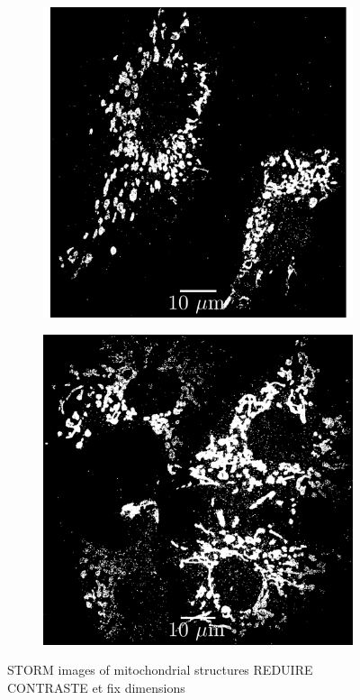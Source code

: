 \begin{figure}
    \begin{subfigure}{0.49\textwidth}
        \includegraphics[width=\textwidth]{figures/mitochondria_image4.png}
        \caption{}
        \label{fig:mitochondria_image4}
    \end{subfigure}
    \begin{subfigure}{0.49\textwidth}
        \includegraphics[width=\textwidth]{figures/mitochondria_image11.png}
        \caption{}
        \label{fig:mitochondria_image11}
    \end{subfigure}
    \caption{STORM images of mitochondrial structures REDUIRE CONTRASTE et fix dimensions}
    \label{fig:mitochondria_images}
\end{figure}


